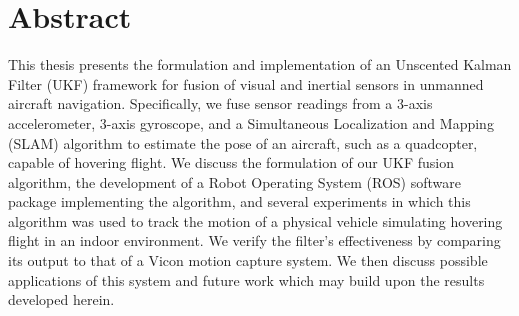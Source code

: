 \chapter*{Abstract}


This thesis presents the formulation and implementation of an Unscented Kalman Filter (UKF) framework for fusion of visual and inertial sensors in unmanned aircraft navigation. Specifically, we fuse sensor readings from a 3-axis accelerometer, 3-axis gyroscope, and a Simultaneous Localization and Mapping (SLAM) algorithm to estimate the pose of an aircraft, such as a quadcopter, capable of hovering flight. We discuss the formulation of our UKF fusion algorithm, the development of a Robot Operating System (ROS) software package implementing the algorithm, and several experiments in which this algorithm was used to track the motion of a physical vehicle simulating hovering flight in an indoor environment. We verify the filter's effectiveness by comparing its output to that of a Vicon motion capture system. We then discuss possible applications of this system and future work which may build upon the results developed herein.